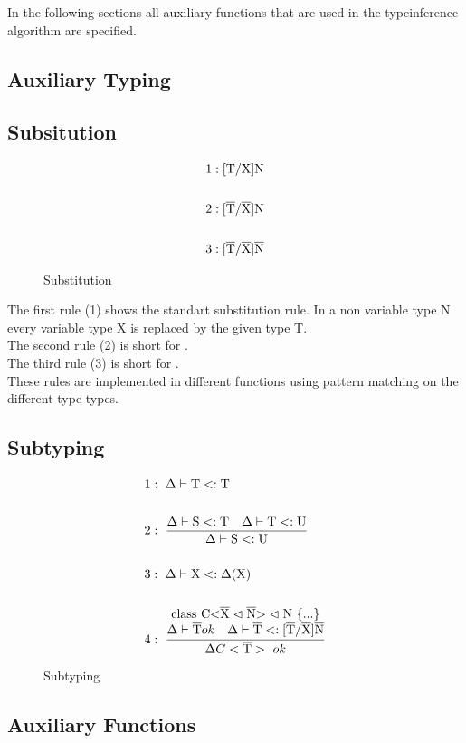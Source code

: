 In the following sections all auxiliary functions that are used in the typeinference algorithm are specified.

\subsection{Auxiliary Typing}

\subsection{Subsitution}

\begin{figure}[H]
    \begin{align*}
1&: \text{[T/X]N}
\\
\\
2&: \text{[}\overline{\text{T}}/\overline{\text{X}}\text{]N}
\\
\\
3&: \text{[}\overline{\text{T}}/\overline{\text{X}}\text{]}\overline{\text{N}}
    \end{align*}
    \caption{Substitution}
    \label{substitution}
\end{figure}

The first rule (1) shows the standart substitution rule. In a non variable type N every variable type X is replaced by the given type T.
\\
The second rule (2) is short for .
\\
The third rule (3) is short for .
\\
These rules are implemented in different functions using pattern matching on the different type types.
\subsection{Subtyping}

\begin{figure}[H]
    \begin{align*}
1&: \ \Delta \vdash \text{T} <: \text{T}
\\
\\
2&: \ \frac{\Delta \vdash \text{S} <: \text{T} \quad \Delta \vdash \text{T} <: \text{U}}{\Delta \vdash \text{S} <: \text{U}}
\\
\\
3&: \ \Delta \vdash \text{X} <: \Delta(\text{X})
\\
\\
4&: \ \frac{
    \begin{matrix}
        \text{class C<} \overline{\text{X}} \vartriangleleft \overline{\text{N}} \text{>} \vartriangleleft \text{N} \ \{...\} \\
        \Delta \vdash \overline{\text{T}} ok \quad \Delta \vdash \overline{\text{T}} <: \text{[}\overline{\text{T}}/\overline{\text{X}}\text{]}\overline{\text{N}}
    \end{matrix}}
    {\Delta C<\overline{\text{T}}> \ ok}
    \end{align*}
    \caption{Subtyping}
    \label{subtyping}
\end{figure}

\subsection{Auxiliary Functions}

